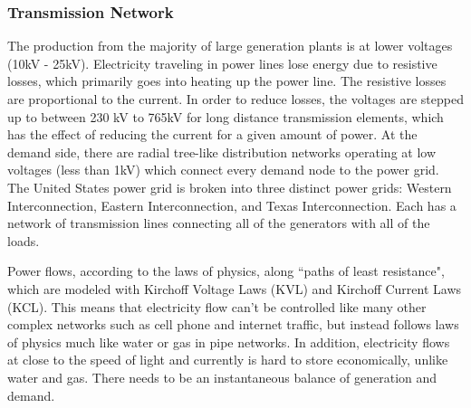 \subsubsection{Transmission Network}
	The production from the majority of large generation plants is at lower voltages (10kV - 25kV).  Electricity traveling in power lines lose energy due to resistive losses, which primarily goes into heating up the power line.  The resistive losses are proportional to the current.  In order to reduce losses, the voltages are stepped up to between 230 kV to 765kV for long distance transmission elements, which has the effect of reducing the current for a given amount of power.  At the demand side, there are radial tree-like distribution networks operating at low voltages (less than 1kV) which connect every demand node to the power grid.  The United States power grid is broken into three distinct power grids: Western Interconnection, Eastern Interconnection, and Texas Interconnection. Each has a network of transmission lines connecting all of the generators with all of the loads.  

	Power flows, according to the laws of physics, along ``paths of least resistance", which are modeled with Kirchoff Voltage Laws (KVL) and Kirchoff Current Laws (KCL).  This means that electricity flow can't be controlled like many other complex networks such as cell phone and internet traffic, but instead follows laws of physics much like water or gas in pipe networks.  In addition, electricity flows at close to the speed of light and currently is hard to store economically, unlike water and gas.   There needs to be an instantaneous balance of generation and demand.  

